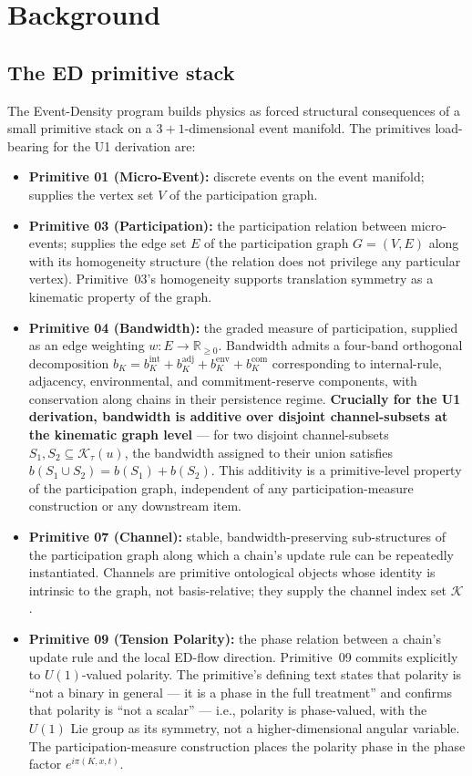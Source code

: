 \documentclass[11pt,a4paper]{article}
\begin{document}
\section{Background}\label{sec:background}

\subsection{The ED primitive stack}

The Event-Density program builds physics as forced structural consequences of a small primitive stack on a $3{+}1$-dimensional event manifold. The primitives load-bearing for the U1 derivation are:

\begin{itemize}
  \item \textbf{Primitive 01 (Micro-Event):} discrete events on the event manifold; supplies the vertex set $V$ of the participation graph.
  \item \textbf{Primitive 03 (Participation):} the participation relation between micro-events; supplies the edge set $E$ of the participation graph $G = (V, E)$ along with its homogeneity structure (the relation does not privilege any particular vertex). Primitive~03's homogeneity supports translation symmetry as a kinematic property of the graph.
  \item \textbf{Primitive 04 (Bandwidth):} the graded measure of participation, supplied as an edge weighting $w : E \to \mathbb{R}_{\geq 0}$. Bandwidth admits a four-band orthogonal decomposition $b_K = b_K^\mathrm{int} + b_K^\mathrm{adj} + b_K^\mathrm{env} + b_K^\mathrm{com}$ corresponding to internal-rule, adjacency, environmental, and commitment-reserve components, with conservation along chains in their persistence regime. \textbf{Crucially for the U1 derivation, bandwidth is additive over disjoint channel-subsets at the kinematic graph level} --- for two disjoint channel-subsets $S_1, S_2 \subseteq \mathcal{K}_\tau(u)$, the bandwidth assigned to their union satisfies $b(S_1 \cup S_2) = b(S_1) + b(S_2)$. This additivity is a primitive-level property of the participation graph, independent of any participation-measure construction or any downstream item.
  \item \textbf{Primitive 07 (Channel):} stable, bandwidth-preserving sub-structures of the participation graph along which a chain's update rule can be repeatedly instantiated. Channels are primitive ontological objects whose identity is intrinsic to the graph, not basis-relative; they supply the channel index set $\mathcal{K}$.
  \item \textbf{Primitive 09 (Tension Polarity):} the phase relation between a chain's update rule and the local ED-flow direction. Primitive~09 commits explicitly to $U(1)$-valued polarity. The primitive's defining text states that polarity is ``not a binary in general --- it is a phase in the full treatment'' and confirms that polarity is ``not a scalar'' --- i.e., polarity is phase-valued, with the $U(1)$ Lie group as its symmetry, not a higher-dimensional angular variable. The participation-measure construction places the polarity phase in the phase factor $e^{i \pi(K, x, t)}$.
\end{itemize}
\end{document}
